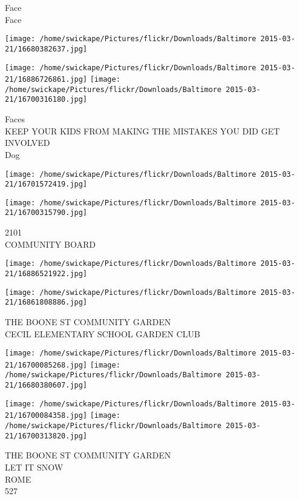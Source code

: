 \documentclass[10pt,letterpaper]{article}
\begin{document}
Face\\
Face\\
\pagebreak

\texttt{[image: /home/swickape/Pictures/flickr/Downloads/Baltimore 2015-03-21/16680382637.jpg]}

\vspace{0.25in}
\texttt{[image: /home/swickape/Pictures/flickr/Downloads/Baltimore 2015-03-21/16886726861.jpg]}
\texttt{[image: /home/swickape/Pictures/flickr/Downloads/Baltimore 2015-03-21/16700316180.jpg]}

Faces\\
KEEP YOUR KIDS FROM MAKING THE MISTAKES YOU DID GET INVOLVED\\
Dog\\
\pagebreak

\texttt{[image: /home/swickape/Pictures/flickr/Downloads/Baltimore 2015-03-21/16701572419.jpg]}

\vspace{0.25in}
\texttt{[image: /home/swickape/Pictures/flickr/Downloads/Baltimore 2015-03-21/16700315790.jpg]}

2101\\
COMMUNITY BOARD\\
\pagebreak

\texttt{[image: /home/swickape/Pictures/flickr/Downloads/Baltimore 2015-03-21/16886521922.jpg]}

\vspace{0.25in}
\texttt{[image: /home/swickape/Pictures/flickr/Downloads/Baltimore 2015-03-21/16861808886.jpg]}

THE BOONE ST COMMUNITY GARDEN\\
CECIL ELEMENTARY SCHOOL GARDEN CLUB\\
\pagebreak

\texttt{[image: /home/swickape/Pictures/flickr/Downloads/Baltimore 2015-03-21/16700085268.jpg]}
\texttt{[image: /home/swickape/Pictures/flickr/Downloads/Baltimore 2015-03-21/16680380607.jpg]}

\texttt{[image: /home/swickape/Pictures/flickr/Downloads/Baltimore 2015-03-21/16700084358.jpg]}
\texttt{[image: /home/swickape/Pictures/flickr/Downloads/Baltimore 2015-03-21/16700313820.jpg]}

THE BOONE ST COMMUNITY GARDEN\\
LET IT SNOW\\
ROME\\
527\\
\pagebreak
\end{document}
